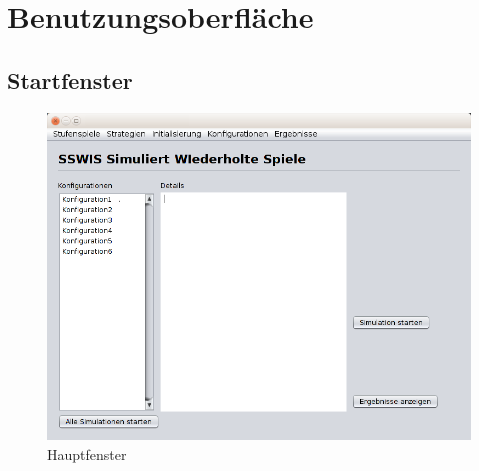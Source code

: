 \section{Benutzungsoberfläche}


\subsection{Startfenster}

\begin{figure}[hp] 
  \centering
     \includegraphics[width=1.1\textwidth]{GUI_Entwurf/Startfenster.png}
  \caption{Hauptfenster}
  \label{fig:Bild1}
\end{figure}

